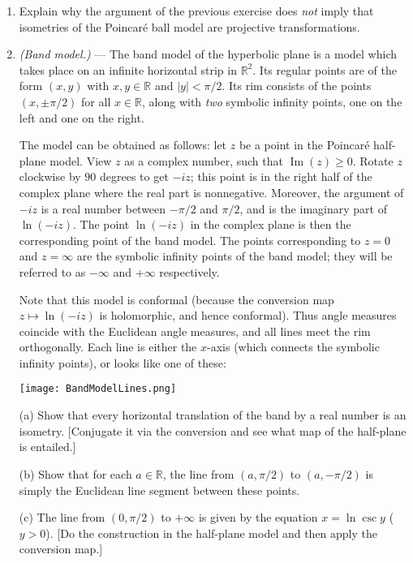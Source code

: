 \documentclass[leqno]{book}
\begin{document}
\begin{enumerate}
(e) Show that a hyperbolic isometry of the hemisphere model is given by a projective transformation of $P^{n+1}(\mathbb R)$ which fixes the upper hemisphere.  [Exercise 1 may help.]

\item Explain why the argument of the previous exercise does \emph{not} imply that isometries of the Poincar\'e ball model are projective transformations.

\item\emph{(Band model.)} \---- The band model of the hyperbolic plane is a model which takes place on an infinite horizontal strip in $\mathbb R^2$.  Its regular points are of the form $(x,y)$ with $x,y\in\mathbb R$ and $|y|<\pi/2$.  Its rim consists of the points $(x,\pm\pi/2)$ for all $x\in\mathbb R$, along with \emph{two} symbolic infinity points, one on the left and one on the right.

The model can be obtained as follows: let $z$ be a point in the Poincar\'e half-plane model.  View $z$ as a complex number, such that $\operatorname{Im}(z)\geqslant 0$.  Rotate $z$ clockwise by $90$ degrees to get $-iz$; this point is in the right half of the complex plane where the real part is nonnegative.  Moreover, the argument of $-iz$ is a real number between $-\pi/2$ and $\pi/2$, and is the imaginary part of $\ln(-iz)$.  The point $\ln(-iz)$ in the complex plane is then the corresponding point of the band model.  The points corresponding to $z=0$ and $z=\infty$ are the symbolic infinity points of the band model; they will be referred to as $-\infty$ and $+\infty$ respectively.

Note that this model is conformal (because the conversion map $z\mapsto\ln(-iz)$ is holomorphic, and hence conformal).  Thus angle measures coincide with the Euclidean angle measures, and all lines meet the rim orthogonally.  Each line is either the $x$-axis (which connects the symbolic infinity points), or looks like one of these:
\begin{center}
\texttt{[image: BandModelLines.png]}
\end{center}
(a) Show that every horizontal translation of the band by a real number is an isometry.  [Conjugate it via the conversion and see what map of the half-plane is entailed.]

(b) Show that for each $a\in\mathbb R$, the line from $(a,\pi/2)$ to $(a,-\pi/2)$ is simply the Euclidean line segment between these points.

(c) The line from $(0,\pi/2)$ to $+\infty$ is given by the equation $x=\ln\csc y$ ($y>0$).  [Do the construction in the half-plane model and then apply the conversion map.]


\end{enumerate}
\end{document}
